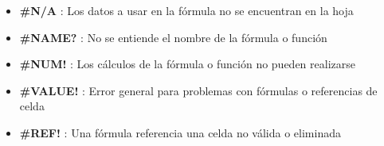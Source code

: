 \begin{description}
{\begin{description}
{\begin{itemize}
            \item {\textbf{\#N/A} : Los datos a usar en la fórmula no se encuentran en la hoja}
            \item {\textbf{\#NAME?} : No se entiende el nombre de la fórmula o función}
            \item {\textbf{\#NUM!} : Los cálculos de la fórmula o función no pueden realizarse}
            \item {\textbf{\#VALUE!} : Error general para problemas con fórmulas o referencias de celda}
            \item {\textbf{\#REF!} : Una fórmula referencia una celda no válida o eliminada}
        \end{itemize}} 
    \end{description}}
\end{description}



